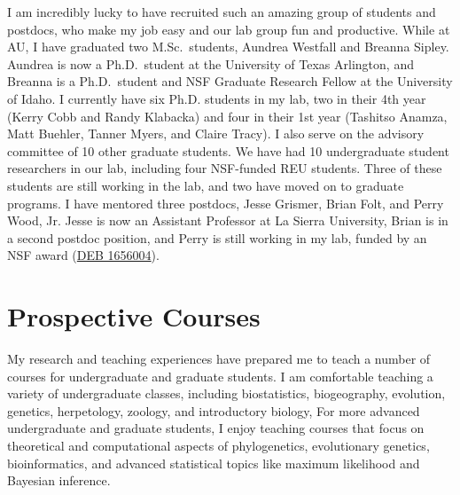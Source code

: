 I am incredibly lucky to have recruited such an amazing group of students and
postdocs, who make my job easy and our lab group fun and productive.
While at AU, I have graduated two M.Sc.\ students, Aundrea Westfall
and Breanna Sipley.
Aundrea is now a Ph.D.\ student at the University of Texas Arlington,
and
Breanna is a Ph.D.\ student and NSF Graduate Research Fellow at the University
of Idaho.
I currently have six Ph.D. students in my lab, two in their 4th
year (Kerry Cobb and Randy Klabacka) and four in their 1st year
(Tashitso Anamza, Matt Buehler, Tanner Myers, and Claire Tracy).
I also serve on the advisory committee of 10 other graduate students.
We have had 10 undergraduate student researchers in our lab, including four
NSF-funded REU students.
Three of these students are still working in the lab,
and two have moved on to graduate programs.
I have mentored three postdocs, Jesse Grismer, Brian Folt, and Perry Wood, Jr.
Jesse is now an Assistant Professor at La Sierra University,
Brian is in a second postdoc position,
and Perry is still working in my lab, funded by an NSF award
(\href{https://www.nsf.gov/awardsearch/showAward?AWD_ID=1656004&HistoricalAwards=false}{DEB 1656004}).


\section*{Prospective Courses}


My research and teaching experiences have prepared me to teach a number of
courses for undergraduate and graduate students.
I am comfortable teaching a variety of undergraduate classes, including
biostatistics,
biogeography,
evolution,
genetics,
herpetology,
zoology,
and
introductory biology,
For more advanced undergraduate and graduate students, I enjoy teaching courses
that focus on theoretical and computational aspects of
phylogenetics,
evolutionary genetics,
bioinformatics,
and
advanced statistical topics like
maximum likelihood
and
Bayesian inference.

